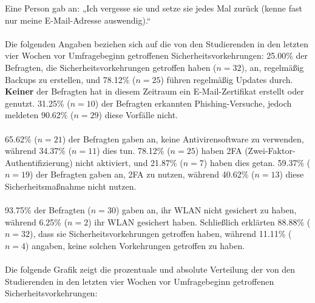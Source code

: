 \documentclass[german,report]{i1thesis}
\begin{document}
Eine Person gab an: „Ich vergesse sie und setze sie jedes Mal zurück (kenne fast nur meine E-Mail-Adresse auswendig).“\\
\\
Die folgenden Angaben beziehen sich auf die von den Studierenden in den letzten vier Wochen vor Umfragebeginn getroffenen Sicherheitsvorkehrungen: 25.00\% der Befragten, die Sicherheitsvorkehrungen getroffen haben (\(n = 32\)), an, regelmäßig Backups zu erstellen, und 78.12\% (\(n = 25\)) führen regelmäßig Updates durch. \textbf{Keiner} der Befragten hat in diesem Zeitraum ein E-Mail-Zertifikat erstellt oder genutzt. 31.25\% (\(n = 10\)) der Befragten erkannten Phishing-Versuche, jedoch meldeten 90.62\% (\(n = 29\)) diese Vorfälle nicht.\\
\\
65.62\% (\(n = 21\)) der Befragten gaben an, keine Antivirensoftware zu verwenden, während 34.37\% (\(n = 11\)) dies tun. 78.12\% (\(n = 25\)) haben 2FA (Zwei-Faktor-Authentifizierung) nicht aktiviert, und 21.87\% (\(n = 7\)) haben dies getan. 59.37\% (\(n = 19\)) der Befragten gaben an, 2FA zu nutzen, während 40.62\% (\(n = 13\)) diese Sicherheitsmaßnahme nicht nutzen.\\
\\
93.75\% der Befragten (\(n = 30\)) gaben an, ihr WLAN nicht gesichert zu haben, während 6.25\% (\(n = 2\)) ihr WLAN gesichert haben. Schließlich erklärten 88.88\% (\(n = 32\)), dass sie Sicherheitsvorkehrungen getroffen haben, während 11.11\% (\(n = 4\)) angaben, keine solchen Vorkehrungen getroffen zu haben.\\
\\
Die folgende Grafik zeigt die prozentuale und absolute Verteilung der von den Studierenden in den letzten vier Wochen vor Umfragebeginn getroffenen Sicherheitsvorkehrungen:
\end{document}
